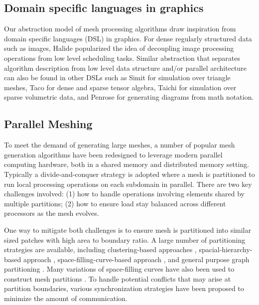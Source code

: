 \subsection{Domain specific languages in graphics}
Our abstraction model of mesh processing algorithms draw inspiration from domain
specific languages (DSL) in graphics.  For dense regularly structured data such
as images, Halide \cite{ragan2013halide} popularized the idea of decoupling image
processing operations from low level scheduling tasks. Similar abstraction that
separates algorithm description from low level data structure and/or parallel
architecture can also be found in other DSLs such as Simit
\cite{kjolstad2016simit} for simulation over triangle meshes, Taco
\cite{kjolstad2017taco} for dense and sparse tensor algebra, Taichi
\cite{hu2019taichi} for simulation over sparse volumetric data, and Penrose
\cite{ye2020penrose} for generating diagrams from math notation.

\subsection{Parallel Meshing}
%
%


To meet the demand of generating large meshes,
a number of popular mesh generation algorithms have been redesigned to
leverage modern parallel computing hardware, both in a shared memory and distributed memory setting. Typically a divide-and-conquer strategy is adopted where a mesh is partitioned to run local processing operations
on each subdomain in parallel.  There are two key challenges involved: (1) how to
handle operations involving elements shared by multiple partitions; (2) how to
ensure load stay balanced across different processors as the mesh evolves.

One way to mitigate both challenges is to ensure mesh is partitioned into
similar sized patches with high area to boundary ratio.
A large number of partitioning strategies are available, including
clustering-based approaches \cite{Mahmoud2021}, spacial-hierarchy-based approach
\cite{loseille2017unique,lo2012parallel}, space-filling-curve-based approach
\cite{marot2019one,borrell2018parallel}, and general purpose graph partitioning \cite{karypis1998fast}. Many variations of space-filling curves have also been used to construct mesh partitions \cite{chrisochoides2006parallel, aluru1997parallel}.
%
To handle potential conflicts that may arise at partition boundaries,
various synchronization strategies have been proposed
\cite{okusanya1996parallel,chrisochoides2003parallel,chrisochoides2006parallel} to minimize the amount of
communication.
%

